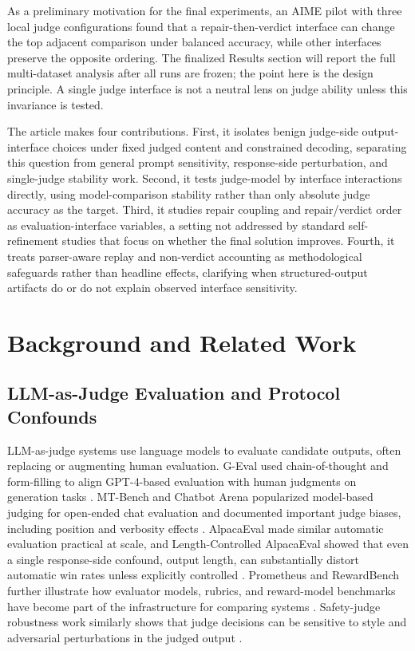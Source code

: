 \documentclass[journal]{IEEEtran}
\begin{document}
As a preliminary motivation for the final experiments, an AIME pilot with three local judge configurations found that a repair-then-verdict interface can change the top adjacent comparison under balanced accuracy, while other interfaces preserve the opposite ordering. The finalized Results section will report the full multi-dataset analysis after all runs are frozen; the point here is the design principle. A single judge interface is not a neutral lens on judge ability unless this invariance is tested.

The article makes four contributions. First, it isolates benign judge-side output-interface choices under fixed judged content and constrained decoding, separating this question from general prompt sensitivity, response-side perturbation, and single-judge stability work. Second, it tests judge-model by interface interactions directly, using model-comparison stability rather than only absolute judge accuracy as the target. Third, it studies repair coupling and repair/verdict order as evaluation-interface variables, a setting not addressed by standard self-refinement studies that focus on whether the final solution improves. Fourth, it treats parser-aware replay and non-verdict accounting as methodological safeguards rather than headline effects, clarifying when structured-output artifacts do or do not explain observed interface sensitivity.

\section{Background and Related Work}
\label{sec:related}

\subsection{LLM-as-Judge Evaluation and Protocol Confounds}
\label{sec:rw-judge}

LLM-as-judge systems use language models to evaluate candidate outputs, often replacing or augmenting human evaluation. G-Eval used chain-of-thought and form-filling to align GPT-4-based evaluation with human judgments on generation tasks \citep{liu2023geval}. MT-Bench and Chatbot Arena popularized model-based judging for open-ended chat evaluation and documented important judge biases, including position and verbosity effects \citep{zheng2024judging}. AlpacaEval made similar automatic evaluation practical at scale, and Length-Controlled AlpacaEval showed that even a single response-side confound, output length, can substantially distort automatic win rates unless explicitly controlled \citep{dubois2024length}. Prometheus and RewardBench further illustrate how evaluator models, rubrics, and reward-model benchmarks have become part of the infrastructure for comparing systems \citep{kim2024prometheus, lambert2024rewardbench}. Safety-judge robustness work similarly shows that judge decisions can be sensitive to style and adversarial perturbations in the judged output \citep{eiras2025know}.
\end{document}
